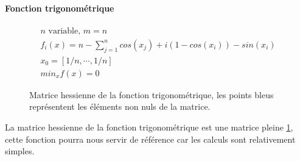 \paragraph{Fonction trigonom\'etrique}
\begin{align*}
n \text{ variable, } m=n \\
f_i(x)=n-\sum_{j=1}^{n}cos(x_j)+i(1-cos(x_i))-sin(x_i) \\
x_0= [1/n, \cdots , 1/n] \\
min_x f(x) = 0
\end{align*}



\begin{figure}
\caption{Matrice hessienne de la fonction trigonom\'etrique, les points bleus repr\'esentent les \'el\'ements non nuls de la
matrice.}

\begin{center}
\end{center}
\label{fig:trigo}
\end{figure}






La matrice hessienne de la fonction trigonom\'etrique est une matrice pleine \ref{fig:trigo}, cette fonction pourra nous servir 
de r\'ef\'erence car les calculs sont relativement simples.



